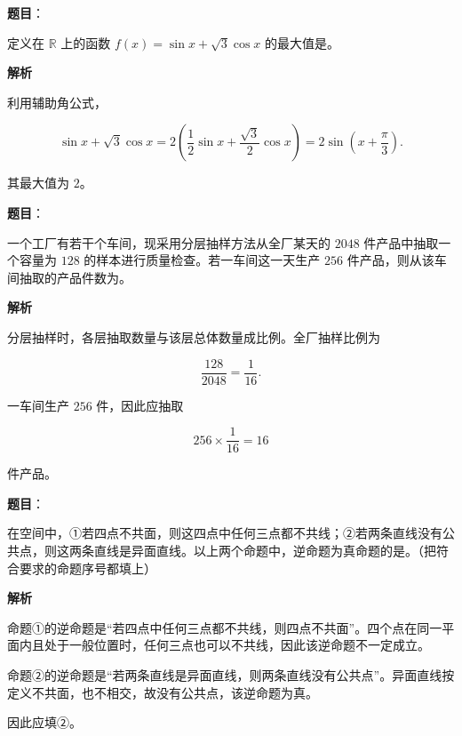 \begin{answer}

\textbf{题目}：

定义在 $\mathbb R$ 上的函数 $f(x)=\sin x+\sqrt3\cos x$ 的最大值是\gkblank{}。

\textbf{解析}

利用辅助角公式，

\nopagebreak[4]
\[
\sin x+\sqrt3\cos x
=2\left(\frac12\sin x+\frac{\sqrt3}{2}\cos x\right)
=2\sin\left(x+\frac\pi3\right).
\]

其最大值为 $2$。


\end{answer}
\begin{answer}

\textbf{题目}：

一个工厂有若干个车间，现采用分层抽样方法从全厂某天的 $2048$ 件产品中抽取一个容量为 $128$ 的样本进行质量检查。若一车间这一天生产 $256$ 件产品，则从该车间抽取的产品件数为\gkblank{}。

\textbf{解析}

分层抽样时，各层抽取数量与该层总体数量成比例。全厂抽样比例为

\nopagebreak[4]
\[
\frac{128}{2048}=\frac1{16}.
\]

一车间生产 $256$ 件，因此应抽取

\nopagebreak[4]
\[
256\times\frac1{16}=16
\]

件产品。


\end{answer}
\begin{answer}

\textbf{题目}：

在空间中，①若四点不共面，则这四点中任何三点都不共线；②若两条直线没有公共点，则这两条直线是异面直线。以上两个命题中，逆命题为真命题的是\gkblank{}。（把符合要求的命题序号都填上）

\textbf{解析}

命题①的逆命题是“若四点中任何三点都不共线，则四点不共面”。四个点在同一平面内且处于一般位置时，任何三点也可以不共线，因此该逆命题不一定成立。

命题②的逆命题是“若两条直线是异面直线，则两条直线没有公共点”。异面直线按定义不共面，也不相交，故没有公共点，该逆命题为真。

因此应填②。


\end{answer}
